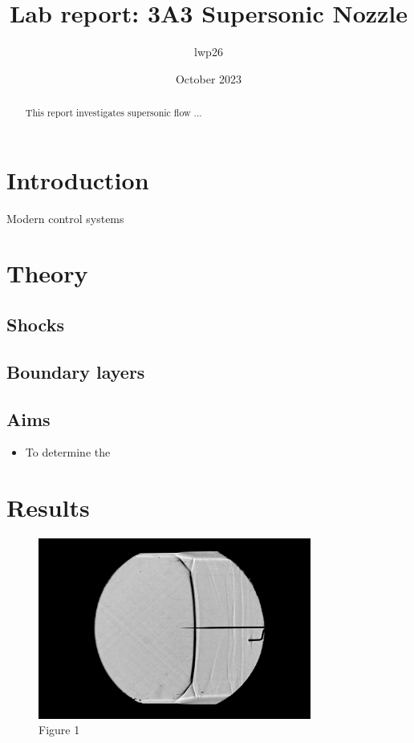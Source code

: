 \documentclass[8pt]{article}
\begin{document}

\title{Lab report: 3A3 Supersonic Nozzle}
\author{lwp26}
\date{October 2023}
\maketitle

\begin{abstract}
    \centering
    This report investigates supersonic flow ...
\end{abstract}

\section{Introduction}

Modern control systems

\section{Theory}

\subsection{Shocks}


\subsection{Boundary layers}


\subsection{Aims}

\begin{itemize}
\item To determine the 
\end{itemize}

\section{Results}

\newpage

\begin{figure}
    \centering
    \includegraphics[width=0.8\textwidth]{starting_shock.jpg}
    \caption{Figure 1}
    \label{fig:figure1}
\end{figure}
\end{document}
